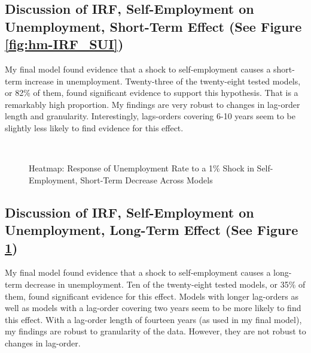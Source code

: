 \documentclass[]{ecca}
\begin{document}
\subsection{Discussion of IRF, Self-Employment on Unemployment, Short-Term Effect (See Figure \ref{fig:hm-IRF_SUI})}
My final model found evidence that a shock to self-employment causes a short-term increase in unemployment. Twenty-three of the twenty-eight tested models, or 82\% of them, found significant evidence to support this hypothesis. That is a remarkably high proportion. My findings are very robust to changes in lag-order length and granularity. Interestingly, lags-orders covering 6-10 years seem to be slightly less likely to find evidence for this effect.
 
 \begin{figure}[!h]
 	\centering
 	\medskip\\
 	\caption{Heatmap: Response of Unemployment Rate to a 1\% Shock in Self-Employment, Short-Term Decrease Across Models}
 	\label{fig:hm-IRF_SUD}
 \end{figure}

 \subsection{Discussion of IRF, Self-Employment on Unemployment, Long-Term Effect (See Figure \ref{fig:hm-IRF_SUD})}
 My final model found evidence that a shock to self-employment causes a long-term decrease in unemployment. Ten of the twenty-eight tested models, or 35\% of them, found significant evidence for this effect. Models with longer lag-orders as well as models with a lag-order covering two years seem to be more likely to find this effect. With a lag-order length of fourteen years (as used in my final model), my findings are robust to granularity of the data. However, they are not robust to changes in lag-order.
 
\end{document}
